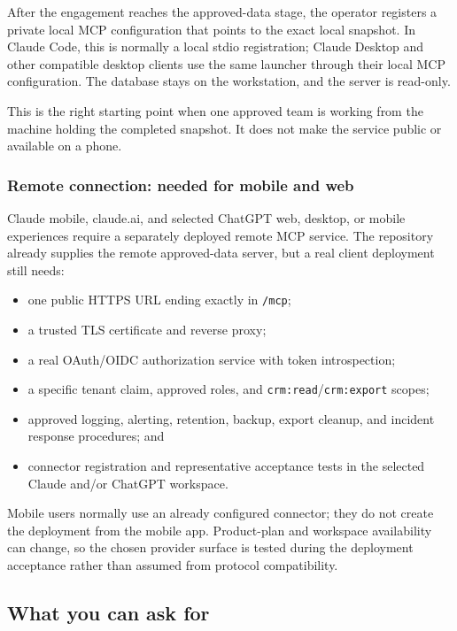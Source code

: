 \documentclass[
]{article}
\providecommand{\tightlist}{%
  \setlength{\itemsep}{0pt}\setlength{\parskip}{0pt}}
\begin{document}
After the engagement reaches the approved-data stage, the operator
registers a private local MCP configuration that points to the exact
local snapshot. In Claude Code, this is normally a local stdio
registration; Claude Desktop and other compatible desktop clients use
the same launcher through their local MCP configuration. The database
stays on the workstation, and the server is read-only.

This is the right starting point when one approved team is working from
the machine holding the completed snapshot. It does not make the service
public or available on a phone.

\subsubsection{Remote connection: needed for mobile and
web}\label{remote-connection-needed-for-mobile-and-web}

Claude mobile, claude.ai, and selected ChatGPT web, desktop, or mobile
experiences require a separately deployed remote MCP service. The
repository already supplies the remote approved-data server, but a real
client deployment still needs:

\begin{itemize}
\tightlist
\item
  one public HTTPS URL ending exactly in \texttt{/\allowbreak{}mcp};
\item
  a trusted TLS certificate and reverse proxy;
\item
  a real OAuth/OIDC authorization service with token introspection;
\item
  a specific tenant claim, approved roles, and
  \texttt{crm:read}/\texttt{crm:export} scopes;
\item
  approved logging, alerting, retention, backup, export cleanup, and
  incident response procedures; and
\item
  connector registration and representative acceptance tests in the
  selected Claude and/or ChatGPT workspace.
\end{itemize}

Mobile users normally use an already configured connector; they do not
create the deployment from the mobile app. Product-plan and workspace
availability can change, so the chosen provider surface is tested during
the deployment acceptance rather than assumed from protocol
compatibility.

\subsection{What you can ask for}\label{what-you-can-ask-for}
\end{document}
